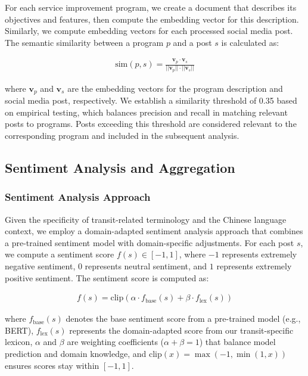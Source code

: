\documentclass[a4paper,fleqn,12pt]{cas-sc}
\begin{document}
For each service improvement program, we create a document that describes its objectives and features, then compute the embedding vector for this description. Similarly, we compute embedding vectors for each processed social media post. The semantic similarity between a program $p$ and a post $s$ is calculated as:

\begin{align}
\text{sim}(p, s) = \frac{\mathbf{v}_p \cdot \mathbf{v}_s}{||\mathbf{v}_p|| \cdot ||\mathbf{v}_s||}
\end{align}

where $\mathbf{v}_p$ and $\mathbf{v}_s$ are the embedding vectors for the program description and social media post, respectively. We establish a similarity threshold of 0.35 based on empirical testing, which balances precision and recall in matching relevant posts to programs. Posts exceeding this threshold are considered relevant to the corresponding program and included in the subsequent analysis.

\subsection{Sentiment Analysis and Aggregation}

\subsubsection{Sentiment Analysis Approach}

Given the specificity of transit-related terminology and the Chinese language context, we employ a domain-adapted sentiment analysis approach that combines a pre-trained sentiment model with domain-specific adjustments. For each post $s$, we compute a sentiment score $f(s) \in [-1, 1]$, where $-1$ represents extremely negative sentiment, $0$ represents neutral sentiment, and $1$ represents extremely positive sentiment. The sentiment score is computed as:

\begin{align}
f(s) = \text{clip}\left( \alpha \cdot f_{\text{base}}(s) + \beta \cdot f_{\text{lex}}(s) \right)
\end{align}

where $f_{\text{base}}(s)$ denotes the base sentiment score from a pre-trained model (e.g., BERT), $f_{\text{lex}}(s)$ represents the domain-adapted score from our transit-specific lexicon, $\alpha$ and $\beta$ are weighting coefficients ($\alpha + \beta = 1$) that balance model prediction and domain knowledge, and $\text{clip}(x) = \max(-1, \min(1, x))$ ensures scores stay within $[-1, 1]$.
\end{document}
